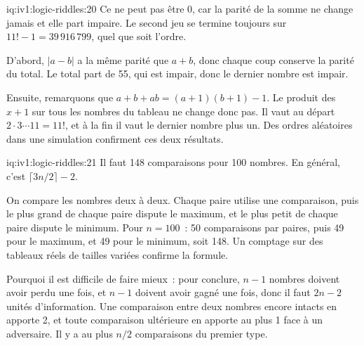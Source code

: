 \begin{solution}{iq:iv1:logic-riddles:20}
Ce ne peut pas être 0, car la parité de la somme ne change jamais et elle part impaire. Le second jeu se termine toujours sur $11! - 1 = 39\,916\,799$, quel que soit l'ordre.

D'abord, $|a - b|$ a la même parité que $a + b$, donc chaque coup conserve la parité du total. Le total part de 55, qui est impair, donc le dernier nombre est impair.

Ensuite, remarquons que $a + b + ab = (a + 1)(b + 1) - 1$. Le produit des $x + 1$ sur tous les nombres du tableau ne change donc pas. Il vaut au départ $2 \cdot 3 \cdots 11 = 11!$, et à la fin il vaut le dernier nombre plus un. Des ordres aléatoires dans une simulation confirment ces deux résultats.

\end{solution}

\begin{solution}{iq:iv1:logic-riddles:21}
Il faut 148 comparaisons pour 100 nombres. En général, c'est $\lceil 3n/2 \rceil - 2$.

On compare les nombres deux à deux. Chaque paire utilise une comparaison, puis le plus grand de chaque paire dispute le maximum, et le plus petit de chaque paire dispute le minimum. Pour $n = 100$~: 50 comparaisons par paires, puis 49 pour le maximum, et 49 pour le minimum, soit 148. Un comptage sur des tableaux réels de tailles variées confirme la formule.

Pourquoi il est difficile de faire mieux~: pour conclure, $n - 1$ nombres doivent avoir perdu une fois, et $n - 1$ doivent avoir gagné une fois, donc il faut $2n - 2$ unités d'information. Une comparaison entre deux nombres encore intacts en apporte 2, et toute comparaison ultérieure en apporte au plus 1 face à un adversaire. Il y a au plus $n/2$ comparaisons du premier type.

\end{solution}

